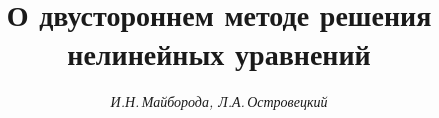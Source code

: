 









\newcommand{\A}{{\cal A}}


\newcommand{\col}{\operatorname{col}}


\newcommand{\vraisup}{\operatorname{vrai~sup}}


\newcommand{\tts}[1]{}










\setcounter{page}{53}












\author{\it И.Н.\,Майборода, Л.А.\,Островецкий}




\title{О двустороннем методе решения нелинейных уравнений}





\date{}







\pagestyle{plain} %













